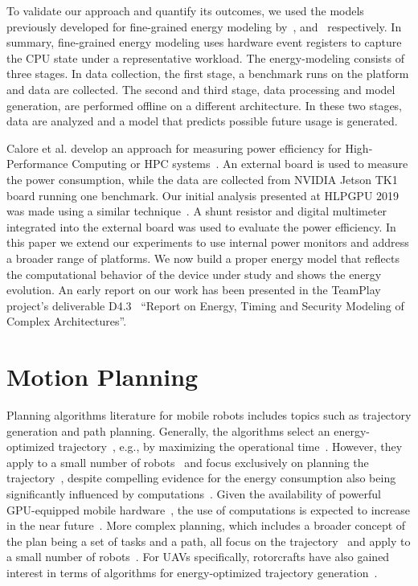 To validate our approach and quantify its outcomes, we used the models previously developed for fine-grained energy modeling by~\citep{nunez2013enabling}, and~\citep{nikov2015evaluation} respectively. In summary, fine-grained energy modeling uses hardware event registers to capture the CPU state under a representative workload. The energy-modeling consists of three stages. In data collection, the first stage, a benchmark runs on the platform and data are collected. The second and third stage, data processing and model generation, are performed offline on a different architecture. In these two stages, data are analyzed and a model that predicts possible future usage is generated. 

Calore et al. develop an approach for measuring power efficiency for High-Performance Computing or HPC systems~\citep{calore2015energy}. An external board is used to measure the power consumption, while the data are collected from NVIDIA Jetson TK1 board running one benchmark. Our initial analysis presented at HLPGPU 2019 was made using a similar technique~\citep{seewald2019hlpgpu}. A shunt resistor and digital multimeter integrated into the external board was used to evaluate the power efficiency. In this paper we extend our experiments to use internal power monitors and address a broader range of platforms. We now build a proper energy model that reflects the computational behavior of the device under study and shows the energy evolution. An early report on our work has been presented in the TeamPlay project's deliverable D4.3~\citep{teamplay} ``Report on Energy, Timing and Security Modeling of Complex Architectures''.


\section{\color{cyan}Motion Planning}
\label{sec:soa-motion-pl}

Planning algorithms literature for mobile robots includes topics such as trajectory generation and path planning. Generally, the algorithms select an energy-optimized trajectory~\cite{mei2004energy}, e.g., by maximizing the operational time~\cite{wahab2015energy}. However, they apply to a small number of robots~\cite{kim2005energy} and focus exclusively on planning the trajectory~\cite{kim2008minimum}, despite compelling evidence for the energy consumption also being significantly influenced by computations~\cite{mei2005case}. Given the availability of powerful GPU-equipped mobile hardware~\cite{rizvi2017general}, the use of computations is expected to increase in the near future~\cite{abramov2012real,satria2016real,jaramillo2019visual}. More complex planning, which includes a broader concept of the plan being a set of tasks and a path, all focus on the trajectory~\cite{mei2005case,mei2006deployment} and apply to a small number of robots~\cite{sadrpour2013mission,sadrpour2013experimental}. For UAVs specifically, rotorcrafts have also gained interest in terms of algorithms for energy-optimized trajectory generation~\cite{morbidi2016minimum,kreciglowa2017energy}. 


